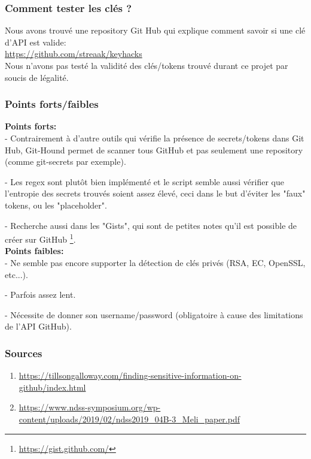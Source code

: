 \subsubsection{Comment tester les clés ?}

Nous avons trouvé une repository Git Hub qui explique comment savoir si une clé d'API est valide:
\\

\url{https://github.com/streaak/keyhacks} \\

Nous n'avons pas testé la validité des clés/tokens trouvé durant ce projet par soucis de légalité.

\subsubsection{Points forts/faibles}

{\bfseries Points forts:} \\

- Contrairement à d'autre outils qui vérifie la présence de secrets/tokens dans Git Hub, Git-Hound permet de scanner
tous GitHub et pas seulement une repository (comme git-secrets par exemple).

- Les regex sont plutôt bien implémenté et le script semble aussi vérifier que l'entropie des secrets trouvés
soient assez élevé, ceci dans le but d'éviter les "faux" tokens, ou les "placeholder".

- Recherche aussi dans les "Gists", qui sont de petites notes qu'il est possible de créer sur GitHub \footnote{\url{https://gist.github.com/}}.
\\

{\bfseries Points faibles:} \\

- Ne semble pas encore supporter la détection de clés privés (RSA, EC, OpenSSL, etc...).

- Parfois assez lent.

- Nécessite de donner son username/password (obligatoire à cause des limitations de l'API GitHub).

\subsubsection{Sources}
\begin{enumerate}
  \item \url{https://tillsongalloway.com/finding-sensitive-information-on-github/index.html}
  \item \url{https://www.ndss-symposium.org/wp-content/uploads/2019/02/ndss2019_04B-3_Meli_paper.pdf}
\end{enumerate}

